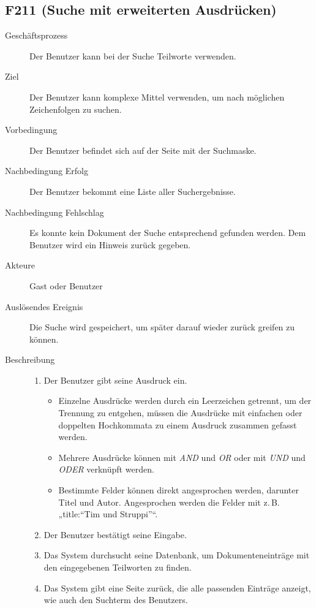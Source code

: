 \subsection{F211 (Suche mit erweiterten Ausdrücken)}
\label{F:extSuche}
\begin{description}
  \item[Geschäftsprozess]Der Benutzer kann bei der Suche Teilworte verwenden.
  \item[Ziel]Der Benutzer kann komplexe Mittel verwenden, um nach möglichen Zeichenfolgen zu suchen.
  \item[Vorbedingung]Der Benutzer befindet sich auf der Seite mit der Suchmaske.
  \item[Nachbedingung Erfolg]Der Benutzer bekommt eine Liste aller Suchergebnisse.
  \item[Nachbedingung Fehlschlag]Es konnte kein Dokument der Suche entsprechend gefunden werden. Dem Benutzer wird ein Hinweis zurück gegeben.
  \item[Akteure]Gast oder Benutzer
  \item[Auslösendes Ereignis]Die Suche wird gespeichert, um später darauf wieder zurück greifen zu können.
  \item[Beschreibung]\hfill
    \begin{enumerate}
      \item Der Benutzer gibt seine Ausdruck ein. 
	\begin{itemize}
	  \item Einzelne Ausdrücke werden durch ein Leerzeichen getrennt, um der Trennung zu entgehen, müssen die Ausdrücke mit einfachen oder doppelten Hochkommata zu einem Ausdruck zusammen gefasst werden. 
	  \item Mehrere Ausdrücke können mit \emph{AND} und \emph{OR} oder mit \emph{UND} und \emph{ODER} verknüpft werden.
	  \item Bestimmte Felder können direkt angesprochen werden, darunter Titel und Autor. Angesprochen werden die Felder mit z.\,B. „title:``Tim und Struppi''“.
	\end{itemize}
      \item Der Benutzer bestätigt seine Eingabe.
      \item Das System durchsucht seine Datenbank, um Dokumenteneinträge mit den eingegebenen Teilworten zu finden.
      \item Das System gibt eine Seite zurück, die alle passenden Einträge anzeigt, wie auch den Suchterm des Benutzers.
    \end{enumerate}
\end{description}

